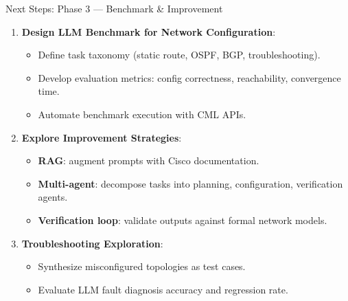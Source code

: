 \documentclass[11pt,aspectratio=169]{beamer}
\begin{document}
\begin{frame}{Next Steps: Phase 3 --- Benchmark \& Improvement}
  \begin{enumerate}
    \item \textbf{Design LLM Benchmark for Network Configuration}:
          \begin{itemize}
            \item Define task taxonomy (static route, OSPF, BGP, troubleshooting).
            \item Develop evaluation metrics: config correctness, reachability,
                  convergence time.
            \item Automate benchmark execution with CML APIs.
          \end{itemize}
    \item \textbf{Explore Improvement Strategies}:
          \begin{itemize}
            \item \textbf{RAG}: augment prompts with Cisco documentation.
            \item \textbf{Multi-agent}: decompose tasks into planning,
                  configuration, verification agents.
            \item \textbf{Verification loop}: validate outputs against
                  formal network models.
          \end{itemize}
    \item \textbf{Troubleshooting Exploration}:
          \begin{itemize}
            \item Synthesize misconfigured topologies as test cases.
            \item Evaluate LLM fault diagnosis accuracy and regression rate.
          \end{itemize}
  \end{enumerate}
\end{frame}
\end{document}
